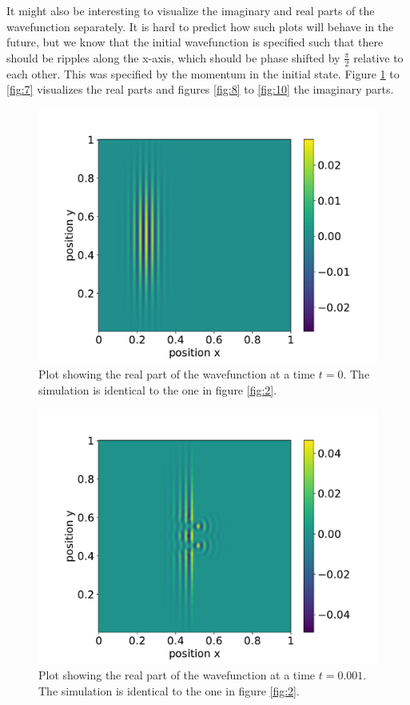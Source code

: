 \documentclass[english,notitlepage,reprint,nofootinbib]{revtex4-1}  %
\begin{document}
It might also be interesting to visualize the imaginary and real parts of the wavefunction separately. It is hard to predict how such plots will behave in the future, but we know that the initial wavefunction is specified such that there should be ripples along the x-axis, which should be phase shifted by $\frac{\pi}{2}$ relative to each other. This was specified by the momentum in the initial state. Figure \ref{fig:5} to \ref{fig:7} visualizes the real parts and figures \ref{fig:8} to \ref{fig:10} the imaginary parts.


\begin{figure}[h!]
    \centering %
    \includegraphics[scale=0.35]{figures/contur_rel_2_t0.pdf} %
    \caption{Plot showing the real part of the wavefunction at a time $t=0$. The simulation is identical to the one in figure \ref{fig:2}.}
    \label{fig:5}
\end{figure}
\FloatBarrier

\begin{figure}[h!]
    \centering %
    \includegraphics[scale=0.35]{figures/contur_rel_2_12T.pdf} %
    \caption{Plot showing the real part of the wavefunction at a time $t=0.001$. The simulation is identical to the one in figure \ref{fig:2}.}
    \label{fig:6}
\end{figure}
\FloatBarrier
\end{document}
